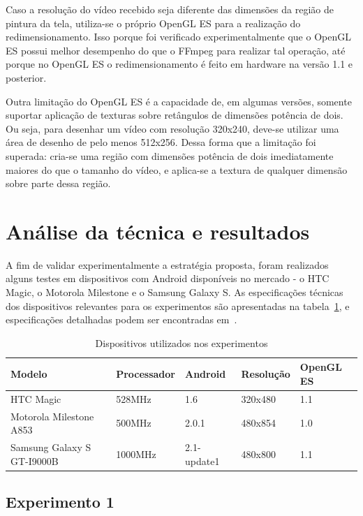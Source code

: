 \documentclass{acm_proc_article-sp}
\begin{document}
Caso a resolução do vídeo recebido seja diferente das dimensões da região de pintura da tela, utiliza-se o próprio OpenGL ES para a realização do redimensionamento. Isso porque foi verificado experimentalmente que o OpenGL ES possui melhor desempenho do que o FFmpeg para realizar tal operação, até porque no OpenGL ES o redimensionamento é feito em hardware na versão 1.1 e posterior.

Outra limitação do OpenGL ES é a capacidade de, em algumas versões, somente suportar aplicação de texturas sobre retângulos de dimensões potência de dois. Ou seja, para desenhar um vídeo com resolução 320x240, deve-se utilizar uma área de desenho de pelo menos 512x256. Dessa forma que a limitação foi superada: cria-se uma região com dimensões potência de dois imediatamente maiores do que o tamanho do vídeo, e aplica-se a textura de qualquer dimensão sobre parte dessa região.

\section{Análise da técnica e resultados}

A fim de validar experimentalmente a estratégia proposta, foram realizados alguns testes em dispositivos com Android disponíveis no mercado - o HTC Magic, o Motorola Milestone e o Samsung Galaxy S. As especificações técnicas dos dispositivos relevantes para os experimentos são apresentadas na tabela~\ref{tabela_dispositivos}, e especificações detalhadas podem ser encontradas em~\cite{gsm_arena}.

\begin{table}
\centering
\caption{Dispositivos utilizados nos experimentos}
\label{tabela_dispositivos}
\begin{tabular}{|p{1.5cm}|p{1.5cm}|p{1cm}|p{1.5cm}|p{1cm}|} \hline
Modelo&Processador&Android&Resolução&OpenGL ES\\ \hline
HTC Magic&528MHz&1.6&320x480&1.1\\ \hline
Motorola Milestone A853&500MHz&2.0.1&480x854&1.0\\ \hline
Samsung Galaxy S GT-I9000B&1000MHz&2.1-update1&480x800&1.1\\
\hline\end{tabular}
\end{table}

\subsection{Experimento 1}
\end{document}
